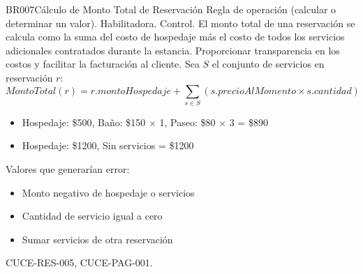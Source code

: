 \begin{BussinesRule}{BR007}{Cálculo de Monto Total de Reservación}
	\BRitem[Tipo:] Regla de operación (calcular o determinar un valor).
	\BRitem[Clase:] Habilitadora.
	\BRitem[Nivel:] Control.
	\BRitem[Descripción:] El monto total de una reservación se calcula como la suma del costo de hospedaje más el costo de todos los servicios adicionales contratados durante la estancia.
	\BRitem[Motivación:] Proporcionar transparencia en los costos y facilitar la facturación al cliente.
	\BRitem[Sentencia:] Sea $S$ el conjunto de servicios en reservación $r$:
		\begin{displaymath}
			MontoTotal(r) = r.montoHospedaje + \sum_{s \in S} (s.precioAlMomento \times s.cantidad)
		\end{displaymath}
		\begin{itemize}
			\item Hospedaje: \$500, Baño: \$150 $\times$ 1, Paseo: \$80 $\times$ 3 = \$890
			\item Hospedaje: \$1200, Sin servicios = \$1200
		\end{itemize}
	 Valores que generarían error:
		\begin{itemize}
			\item Monto negativo de hospedaje o servicios
			\item Cantidad de servicio igual a cero
			\item Sumar servicios de otra reservación
		\end{itemize}
	 CUCE-RES-005, CUCE-PAG-001.
\end{BussinesRule}

